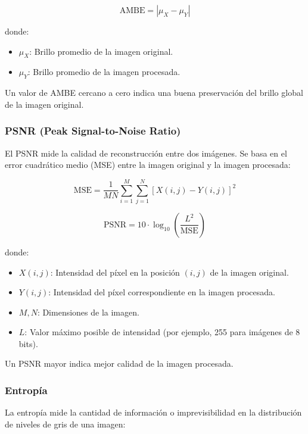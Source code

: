 \documentclass[sigchi]{acmart}
\begin{document}
\begin{equation}
	\text{AMBE} = \left| \mu_X - \mu_Y \right|
\end{equation}

donde:
\begin{itemize}
	\item $\mu_X$: Brillo promedio de la imagen original.
	\item $\mu_Y$: Brillo promedio de la imagen procesada.
\end{itemize}

Un valor de AMBE cercano a cero indica una buena preservación del brillo global de la imagen original.

\subsubsection{PSNR (Peak Signal-to-Noise Ratio)}
El PSNR mide la calidad de reconstrucción entre dos imágenes. Se basa en el error cuadrático
medio (MSE) entre la imagen original y la imagen procesada:

\begin{equation}
	\text{MSE} = \frac{1}{MN} \sum_{i=1}^{M} \sum_{j=1}^{N} \left[ X(i,j) - Y(i,j) \right]^2
\end{equation}

\begin{equation}
	\text{PSNR} = 10 \cdot \log_{10} \left( \frac{L^2}{\text{MSE}} \right)
\end{equation}

donde:
\begin{itemize}
	\item $X(i,j)$: Intensidad del píxel en la posición $(i,j)$ de la imagen original.
	\item $Y(i,j)$: Intensidad del píxel correspondiente en la imagen procesada.
	\item $M, N$: Dimensiones de la imagen.
	\item $L$: Valor máximo posible de intensidad (por ejemplo, 255 para imágenes de 8 bits).
\end{itemize}

Un PSNR mayor indica mejor calidad de la imagen procesada.

\subsubsection{Entropía}
La entropía mide la cantidad de información o imprevisibilidad en la distribución de niveles de gris de una imagen:
\end{document}
